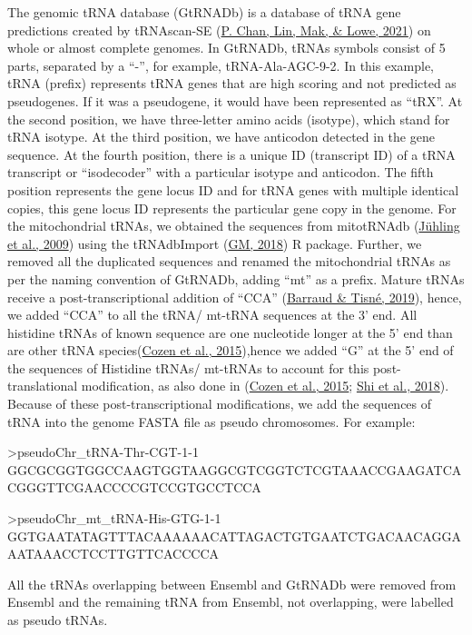 \documentclass[12pt,twoside]{reedthesis}
\newenvironment{Shaded}{\begin{snugshade}}{\end{snugshade}}
\newcommand{\NormalTok}[1]{#1}
\begin{document}
The genomic tRNA database (GtRNADb) is a database of tRNA gene
predictions created by tRNAscan-SE (\protect\hyperlink{ref-chan2021}{P. Chan, Lin, Mak, \& Lowe, 2021}) on whole or almost
complete genomes. In GtRNADb, tRNAs symbols consist of 5 parts,
separated by a ``-'', for example, tRNA-Ala-AGC-9-2. In this example, tRNA
(prefix) represents tRNA genes that are high scoring and not predicted
as pseudogenes. If it was a pseudogene, it would have been represented
as ``tRX''. At the second position, we have three-letter amino acids
(isotype), which stand for tRNA isotype. At the third position, we have
anticodon detected in the gene sequence. At the fourth position, there
is a unique ID (transcript ID) of a tRNA transcript or ``isodecoder'' with
a particular isotype and anticodon. The fifth position represents the
gene locus ID and for tRNA genes with multiple identical copies, this
gene locus ID represents the particular gene copy in the genome. For the
mitochondrial tRNAs, we obtained the sequences from mitotRNAdb
(\protect\hyperlink{ref-juxfchling2009}{Jühling et al., 2009}) using the tRNAdbImport (\protect\hyperlink{ref-gm2018}{GM, 2018}) R package. Further, we
removed all the duplicated sequences and renamed the mitochondrial tRNAs
as per the naming convention of GtRNADb, adding ``mt'' as a prefix. Mature
tRNAs receive a post-transcriptional addition of ``CCA'' (\protect\hyperlink{ref-barraud2019}{Barraud \& Tisné, 2019}),
hence, we added ``CCA'' to all the tRNA/ mt-tRNA sequences at the 3' end.
All histidine tRNAs of known sequence are one nucleotide longer at the
5' end than are other tRNA species(\protect\hyperlink{ref-cozen2015}{Cozen et al., 2015}),hence we added ``G'' at the 5' end of the sequences of Histidine tRNAs/ mt-tRNAs to account for this post-translational modification, as also
done in (\protect\hyperlink{ref-cozen2015}{Cozen et al., 2015}; \protect\hyperlink{ref-shi2018}{Shi et al., 2018}). Because of these post-transcriptional
modifications, we add the sequences of tRNA into the genome FASTA file
as pseudo chromosomes. For example:
\begin{Shaded}
\begin{Highlighting}[]
\NormalTok{\textgreater{}pseudoChr\_tRNA{-}Thr{-}CGT{-}1{-}1}
\NormalTok{GGCGCGGTGGCCAAGTGGTAAGGCGTCGGTCTCGTAAACCGAAGATCACGGGTTCGAACCCCGTCCGTGCCTCCA}

\NormalTok{\textgreater{}pseudoChr\_mt\_tRNA{-}His{-}GTG{-}1{-}1}
\NormalTok{GGTGAATATAGTTTACAAAAAACATTAGACTGTGAATCTGACAACAGGAAATAAACCTCCTTGTTCACCCCA}
\end{Highlighting}
\end{Shaded}
All the tRNAs overlapping between Ensembl and GtRNADb were removed from
Ensembl and the remaining tRNA from Ensembl, not overlapping, were
labelled as pseudo tRNAs.
\end{document}
